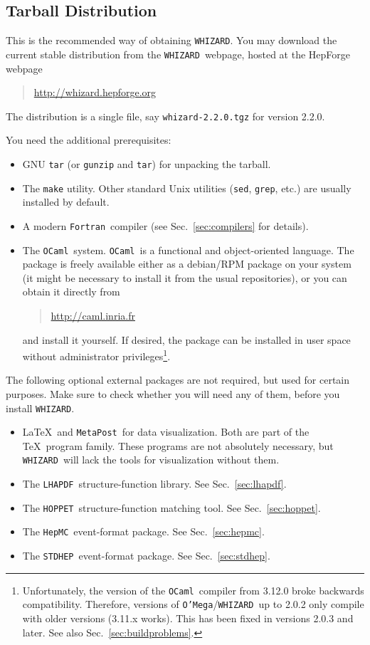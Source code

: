 \documentclass[12pt]{book}
\newcommand{\whizardpage}{\url{http://whizard.event-generator.org}}
\newcommand{\hepforgepage}{\url{http://whizard.hepforge.org}}
\newcommand{\ttt}[1]{\texttt{#1}}
\newcommand{\whizard}{\texttt{WHIZARD}}
\newcommand{\oMega}{\texttt{O'Mega}}
\newcommand{\stdhep}{\texttt{STDHEP}}
\newcommand{\lhapdf}{\texttt{LHAPDF}}
\newcommand{\hepmc}{\texttt{HepMC}}
\newcommand{\hoppet}{\texttt{HOPPET}}
\newcommand{\metapost}{\texttt{MetaPost}}
\newcommand{\fortran}{\texttt{Fortran}}
\newcommand{\ocaml}{\texttt{OCaml}}
\newcommand{\thisversion}{2.2.0}
\begin{document}
\subsection{Tarball Distribution}

This is the recommended way of obtaining \whizard.  You may download
the current stable distribution 
from the \whizard\ webpage, 
hosted at the HepForge webpage
\begin{quote}
  \hepforgepage
\end{quote}
The distribution is a single file, say \ttt{whizard-\thisversion.tgz} for
version \thisversion.

You need the additional prerequisites:
\begin{itemize}
\item
  GNU \ttt{tar} (or \ttt{gunzip} and \ttt{tar}) for unpacking the
  tarball.
\item
  The \ttt{make} utility.  Other standard Unix utilities (\ttt{sed},
  \ttt{grep}, etc.) are usually installed by default.
\item
  A modern \fortran\ compiler (see Sec.~\ref{sec:compilers} for
  details).
\item
  The \ocaml\ system.  \ocaml\ is a functional and object-oriented
  language.  The package is freely available either as a debian/RPM package
  on your system (it might be necessary to install it from the usual
  repositories), or you can obtain it directly from
  \begin{quote}
    \url{http://caml.inria.fr}
  \end{quote}
  and install it yourself.  If desired, the package can be installed
  in user space without administrator privileges\footnote{
    Unfortunately, the version of the \ocaml\
    compiler from 3.12.0 broke backwards compatibility. Therefore, 
    versions of \oMega/\whizard\ up to 2.0.2 only compile with older
    versions (3.11.x works). This has been fixed in versions 
    2.0.3 and later. See also Sec.~\ref{sec:buildproblems}.}.
\end{itemize}
The following optional external packages are not required, but used
for certain purposes.  Make sure to check whether you will need any of
them, before you install \whizard.
\begin{itemize}
\item
  \LaTeX\ and \metapost\ for data visualization.  Both are part of the
  \TeX\ program family.  These programs are not absolutely necessary,
  but \whizard\ will lack the tools for visualization without them.
\item
  The \lhapdf\ structure-function library.  See
  Sec.~\ref{sec:lhapdf}.
\item
  The \hoppet\ structure-function matching tool. See 
  Sec.~\ref{sec:hoppet}.
\item
  The \hepmc\ event-format package.  See Sec.~\ref{sec:hepmc}.
\item
  The \stdhep\ event-format package.  See Sec.~\ref{sec:stdhep}.
\end{itemize}
\end{document}

